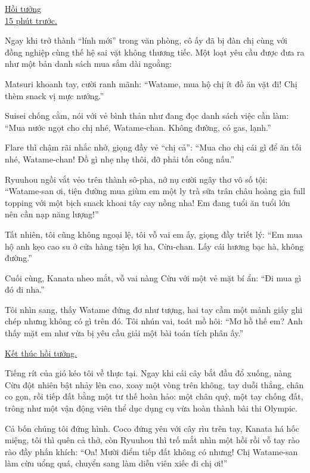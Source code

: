 \documentclass[../main.tex]{subfiles}
\begin{document}

\begin{center}
  \uline{Hồi tưởng\\15 phút trước.}
\end{center}

Ngay khi trở thành ``lính mới'' trong văn phòng, cô ấy đã bị đàn chị cùng với đồng nghiệp cùng thế hệ sai vặt không thương tiếc. Một loạt yêu cầu được đưa ra như một bản danh sách mua sắm dài ngoằng:

Matsuri khoanh tay, cười ranh mãnh: ``Watame, mua hộ chị ít đồ ăn vặt đi! Chị thèm snack vị mực nướng.''

Suisei chống cằm, nói với vẻ bình thản như đang đọc danh sách việc cần làm: ``Mua nước ngọt cho chị nhé, Watame-chan. Không đường, có gas, lạnh.''

Flare thì chậm rãi nhắc nhở, giọng đầy vẻ ``chị cả'': ``Mua cho chị cái gì để ăn tối nhé, Watame-chan! Đồ gì nhẹ nhẹ thôi, đỡ phải tốn công nấu.''

Ryuuhou ngồi vắt vẻo trên thành sô-pha, nở nụ cười ngây thơ vô số tội: ``Watame-san ơi, tiện đường mua giùm em một ly trà sữa trân châu hoàng gia full topping với một bịch snack khoai tây cay nồng nha! Em đang tuổi ăn tuổi lớn nên cần nạp năng lượng!''

Tất nhiên, tôi cũng không ngoại lệ, tôi vỗ vai em ấy, giọng đầy triết lý: ``Em mua hộ anh kẹo cao su ở cửa hàng tiện lợi ha, Cừu-chan. Lấy cái hương bạc hà, không đường.''

Cuối cùng, Kanata nheo mắt, vỗ vai nàng Cừu với một vẻ mặt bí ẩn: ``Đi mua gì đó đi nha.''

Tôi nhìn sang, thấy Watame đứng đơ như tượng, hai tay cầm một mảnh giấy ghi chép nhưng không có gì trên đó. Tôi nhún vai, toát mồ hôi: ``Mơ hồ thế em? Anh thấy mặt em như vừa bị yêu cầu giải một bài toán tích phân ấy.''

\begin{center}
  \uline{Kết thúc hồi tưởng.}
\end{center}

Tiếng rít của gió kéo tôi về thực tại. Ngay khi cái cây bắt đầu đổ xuống, nàng Cừu đột nhiên bật nhảy lên cao, xoay một vòng trên không, tay duỗi thẳng, chân co gọn, rồi tiếp đất bằng một tư thế hoàn hảo: một chân quỳ, một tay chống đất, trông như một vận động viên thể dục dụng cụ vừa hoàn thành bài thi Olympic.


Cả bốn chúng tôi đứng hình. Coco đứng yên với cây rìu trên tay, Kanata há hốc miệng, tôi thì quên cả thở, còn Ryuuhou thì trố mắt nhìn một hồi rồi vỗ tay rào rào đầy phấn khích: ``Oa! Mười điểm tiếp đất không có nhưng! Chị Watame-san làm cừu uổng quá, chuyển sang làm diễn viên xiếc đi chị ơi!''
\end{document}
